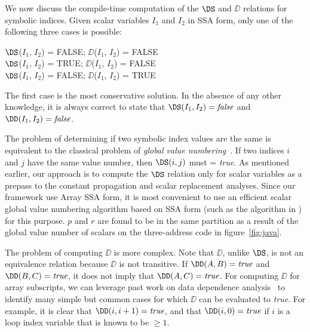 {We now discuss the compile-time
computation of the $\DS$ and $\DD$ relations for symbolic
indices. 
Given scalar variables $I_1$ and $I_2$
in SSA form, only one of the following three cases
is possible:
\begin{center}
\parbox{3.0in}{
\begin{programa}
$\DS$($I_1$, $I_2$) = FALSE; $\DD$($I_1$, $I_2$) = FALSE \\
$\DS$($I_1$, $I_2$) = TRUE; $\DD$($I_1$, $I_2$) = FALSE \\
$\DS$($I_1$, $I_2$) = FALSE; $\DD$($I_1$, $I_2$) = TRUE \\
\end{programa}
}
\end{center}
The first case is the most conservative solution.  In the absence of
any other knowledge, it is always correct to state that
$\DS(I_1,I_2) = \mbox{\it false}$ and $\DD(I_1,I_2) = \mbox{\it
false}$.

The problem of determining if two symbolic index values are the same
is equivalent to the classical problem of {\it global value
numbering}~\cite{AlWZ88,Much97}. If two indices $i$ and $j$ have the
same value number, then $\DS(i,j)$ must = {\it true}.  As mentioned
earlier, our approach is to compute the $\DS$ relation only for scalar
variables as a prepass to the constant propagation and scalar
replacement analyses.  Since our framework use Array SSA form, it is
most convenient to use an efficient scalar global value numbering
algorithm based on SSA form (such as the algorithm in
\cite{AlWZ88}) for this purpose. $p$ and $r$ are found to be in the
same partition as a result of the global value number of scalars on
the three-address code in figure~\ref{fig:java}.


The problem of
computing $\DD$ is more complex.  Note that $\DD$, unlike $\DS$, is not
an equivalence relation because $\DD$ is not transitive.  If $\DD(A,
B)=\mbox{\it true}$ and $\DD(B, C)=\mbox{\it true}$, it does not imply
that $\DD(A, C)=\mbox{\it true}$.  For computing $\DD$ for array
subscripts, we can leverage past work on data dependence
analysis~\cite{Wolf89} to identify many simple but common cases for
which $\DD$ can be evaluated to {\it true}.  For example, it is clear
that $\DD(i, i+1) = \mbox{\it true}$, and that $\DD(i, 0) = \mbox{\it
true}$ if $i$ is a loop index variable that is known to be $\geq 1$.

}
